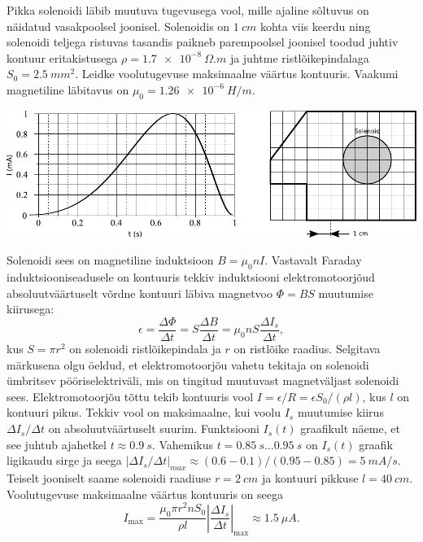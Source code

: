 
Pikka solenoidi läbib muutuva tugevusega vool, mille ajaline sõltuvus on näidatud vasakpoolsel joonisel. Solenoidis on $\SI{1}{cm}$ kohta viis keerdu ning solenoidi teljega ristuvas tasandis paikneb parempoolsel joonisel toodud juhtiv kontuur
	eritakistusega $\rho=\SI{1,7e-8}{\Omega.m}$ ja juhtme ristlõikepindalaga $S_0=\SI{2,5}{mm^2}$. Leidke voolutugevuse maksimaalne väärtus kontuuris. Vaakumi magnetiline läbitavus on $\mu_0=\SI{1.26e-6}{H/m}$.
	
	\begin{center}
		\includegraphics[width=1\linewidth]{2020-lahg-05-yl.pdf}
	\end{center}


	
	
	
	
\hint

\solu
Solenoidi sees on magnetiline induktsioon $B = \mu_0 nI$. Vastavalt Faraday induktsiooniseadusele on kontuuris tekkiv induktsiooni elektromotoorjõud absoluutväärtuselt võrdne kontuuri läbiva magnetvoo $\Phi=BS$ muutumise kiirusega:
\[
\epsilon=\frac{\Delta \Phi}{\Delta t}=S\frac{\Delta B}{\Delta t}=\mu_0 n S \frac{\Delta I_s}{\Delta t},
\]
kus $S=\pi r^2$ on solenoidi ristlõikepindala ja $r$ on ristlõike raadius. Selgitava märkusena olgu öeldud, et elektromotoorjõu vahetu tekitaja on solenoidi ümbritsev pööriselektriväli, mis on tingitud muutuvast magnetväljast solenoidi sees. Elektromotoorjõu tõttu tekib kontuuris vool $I=\epsilon/R =\epsilon S_0/(\rho l)$, kus $l$ on kontuuri pikus.
Tekkiv vool on maksimaalne, kui voolu $I_s$ muutumise kiirus $\Delta I_s/\Delta t$ on absoluutväärtuselt suurim. Funktsiooni $I_s(t)$ graafikult näeme, et see juhtub ajahetkel $t\approx \SI{0,9}{s}$. Vahemikus 
$t=\SI{0.85}{s} \ldots \SI{0.95}{s}$ on $I_s(t)$ graafik ligikaudu sirge ja seega $|\Delta I_s/\Delta t|_{max} \approx (\num{0,6}-\num{0,1})/(\num{0,95}-\num{0,85})=\SI{5}{mA/s}$. Teiselt jooniselt saame solenoidi raadiuse $r=\SI{2}{cm}$ ja kontuuri pikkuse $l=\SI{40}{cm}$. Voolutugevuse maksimaalne väärtus kontuuris on seega
\[
I_{\mathrm{max}}=\frac{\mu_0 \pi r^2 n S_0 }{\rho l}\left|\frac{\Delta I_s}{\Delta t}\right|_{\mathrm{max}}\approx \SI{1,5}{\mu A}.
\]
\probend